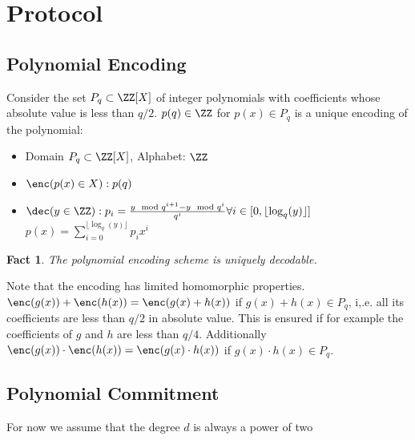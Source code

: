 \documentclass{article}
\newtheorem{fact}{Fact}
\begin{document}
\section{Protocol}
\label{sec:protocol}

\subsection{Polynomial Encoding}

	Consider the set $P_q\subset \ZZ[X]$ of integer polynomials with coefficients whose absolute value is less than $q/2$. $p(q) \in \ZZ$ for $p(x)\in P_q$ is a unique encoding of the polynomial:
\begin{itemize}
	\item Domain $P_q \subset \ZZ[X]$, Alphabet: $\ZZ$
	\item $\enc(p(x) \in X): p(q)$
	\item $\dec(y \in \ZZ): p_i=\frac{y \mod q^{i+1}-y \mod q^{i}}{q^i} \forall i \in [0,\lfloor\log_q(y)\rfloor]$\\
	$p(x)=\sum_{i=0}^{\lfloor\log_q(y)\rfloor} p_i x^i$
\end{itemize}

\begin{fact}
	The polynomial encoding scheme is uniquely decodable.
\end{fact}

Note that the encoding has limited homomorphic properties. $\enc(g(x))+\enc(h(x))=\enc(g(x)+h(x))$ if $g(x)+h(x)\in P_q$, i,.e. all its coefficients are less than $q/2$ in absolute value. This is ensured if for example the coefficients of $g$ and $h$ are less than $q/4$. Additionally $\enc(g(x))\cdot \enc(h(x))=\enc(g(x)\cdot h(x))$ if $g(x)\cdot h(x)\in P_q$.
\subsection{Polynomial Commitment}
 For now we assume that the degree $d$ is always a power of two
\end{document}
